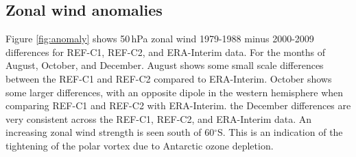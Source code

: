 \subsection{Zonal wind anomalies}
Figure \ref{fig:anomaly} shows 50\,hPa zonal wind 1979-1988 minus 2000-2009 differences for REF-C1, REF-C2, and ERA-Interim data. For the months of August, October, and December. August shows some small scale differences between the REF-C1 and REF-C2 compared to ERA-Interim. October shows some larger differences, with an opposite dipole in the western hemisphere when comparing REF-C1 and REF-C2 with ERA-Interim. the December differences are very consistent across the REF-C1, REF-C2, and ERA-Interim data. An increasing zonal wind strength is seen south of 60$^\circ$S. This is an indication of the tightening of the polar vortex due to Antarctic ozone depletion.